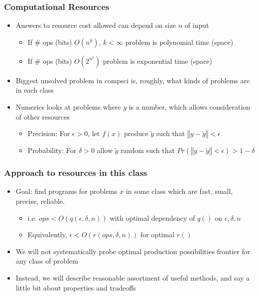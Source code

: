 \documentclass[bigger]{beamer}
\begin{document}
\begin{frame}%

\frametitle{Computational Resources}

\begin{itemize}

\item Answers to resource cost allowed can depend on size $n$ of input
    \begin{itemize}
    \item If $\#$ ops (bits) $O(n^k)$, $k<\infty$ problem is polynomial time (space)
    \item If $\#$ ops (bits) $O(2^{n^k})$ problem is exponential time (space)
    \end{itemize}
\item Biggest unsolved problem in compsci is, roughly, what kinds of problems are in each class
\item Numerics looks at problems where $y$ is a number, which allows consideration of other resources
    \begin{itemize}
    \item Precision: For $\epsilon>0$, let $f(x)$ produce $\tilde{y}$ such that $\left\Vert y-\tilde{y}\right\Vert<\epsilon$
    \item Probability: For $\delta>0$ allow $\tilde{y}$ random such that $Pr(\left\Vert y-\tilde{y}\right\Vert<\epsilon)>1-\delta$
    \end{itemize}


\end{itemize}

\end{frame}%

\begin{frame}%

\frametitle{Approach to resources in this class}

\begin{itemize}


\item Goal: find programs for problems $x$ in some class which are fast, small, precise, reliable.
    \begin{itemize}
    \item i.e. $ops<O(q(\epsilon,\delta,n))$ with optimal dependency of $q()$ on $\epsilon,\delta,n$
    \item Equivalently, $\epsilon<O(r(ops,\delta,n))$ for optimal $r()$
    \end{itemize}

\item We will not systematically probe optimal production possibilities frontier for any class of problem
\item Instead, we will describe reasonable assortment of useful methods, and say a little bit about properties and tradeoffs


\end{itemize}

\end{frame}
\end{document}
